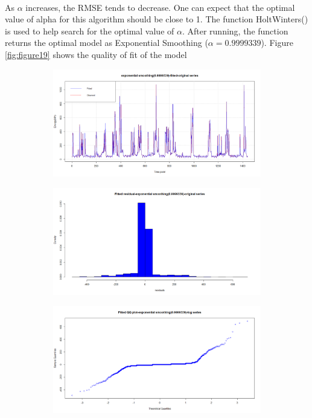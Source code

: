 \documentclass[12pt]{article}
\begin{document}
\paragraph{}
As $\alpha$ increases, the RMSE tends to decrease. One can expect that the optimal value of alpha for this algorithm should be close to 1. The function HoltWinters() is used to help search for the optimal value of $\alpha$. After running, the function returns the optimal model as Exponential Smoothing ($\alpha=0.9999339$). Figure \ref{fig:figure19} shows the quality of fit of the model 
\begin{figure}[H]
  \centering
  \begin{subfigure}[b]{0.49\linewidth}
    \includegraphics[width=\linewidth]{figure19-1.png}
  \end{subfigure}
  \begin{subfigure}[b]{0.49\linewidth}
    \includegraphics[width=\linewidth]{figure19-2.png}
  \end{subfigure}
  \begin{subfigure}[b]{0.49\linewidth}
    \includegraphics[width=\linewidth]{figure19-3.png}

\end{subfigure}
\end{figure}
\end{document}
